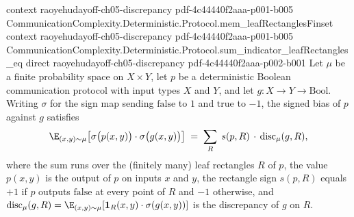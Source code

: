 \begin{lemma}
  {context}
  {raoyehudayoff-ch05-discrepancy}
  {pdf-4c44440f2aaa-p001-b005}
\proofstep
  {CommunicationComplexity.Deterministic.Protocol.mem_leafRectanglesFinset}
  {context}
  {raoyehudayoff-ch05-discrepancy}
  {pdf-4c44440f2aaa-p001-b005}
\proofstep
  {CommunicationComplexity.Deterministic.Protocol.sum_indicator_leafRectangles_eq}
  {direct}
  {raoyehudayoff-ch05-discrepancy}
  {pdf-4c44440f2aaa-p002-b001}
Let $\mu$ be a finite probability space on $X \times Y$, let $p$ be a deterministic
Boolean communication protocol with input types $X$ and $Y$, and let $g : X \to Y \to
\mathrm{Bool}$. Writing $\sigma$ for the sign map sending $\mathrm{false}$ to $1$ and
$\mathrm{true}$ to $-1$, the signed bias of $p$ against $g$ satisfies
\[
  \E_{(x,y)\sim\mu}\bigl[\sigma\bigl(p(x,y)\bigr)\cdot\sigma\bigl(g(x,y)\bigr)\bigr]
  \;=\;
  \sum_{R}\; s(p,R)\,\cdot\,\mathrm{disc}_\mu(g,R),
\]
where the sum runs over the (finitely many) leaf rectangles $R$ of $p$, the value
$p(x,y)$ is the output of $p$ on inputs $x$ and $y$, the rectangle sign $s(p,R)$ equals
$+1$ if $p$ outputs $\mathrm{false}$ at every point of $R$ and $-1$ otherwise, and
$\mathrm{disc}_\mu(g,R) = \E_{(x,y)\sim\mu}[\mathbf{1}_R(x,y)\cdot\sigma(g(x,y))]$ is
the discrepancy of $g$ on $R$.
\end{lemma}

